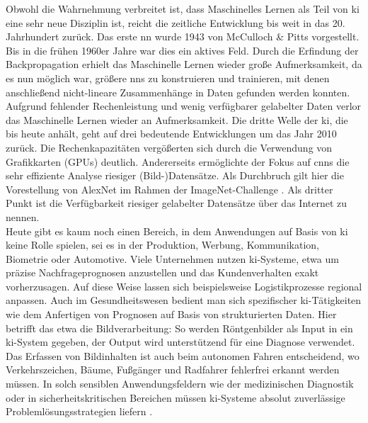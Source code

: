 \documentclass[twoside, 12pt,a4paper]{book}
\numberwithin{equation}{section}
\begin{document}
	\noindent Obwohl die Wahrnehmung verbreitet ist, dass Maschinelles Lernen als Teil von \ac{ki} eine sehr neue Disziplin ist, reicht die zeitliche Entwicklung bis weit in das 20. Jahrhundert zurück. Das erste \ac{nn} wurde 1943 von McCulloch \& Pitts vorgestellt. Bis in die frühen 1960er Jahre war dies ein aktives Feld. Durch die Erfindung der Backpropagation erhielt das Maschinelle Lernen wieder große Aufmerksamkeit, da es nun möglich war, größere \acp{nn} zu konstruieren und trainieren, mit denen anschließend nicht-lineare Zusammenhänge in Daten gefunden werden konnten.\\
	\noindent Aufgrund fehlender Rechenleistung und wenig verfügbarer gelabelter Daten verlor das Maschinelle Lernen wieder an Aufmerksamkeit. Die dritte Welle der \ac{ki}, die bis heute anhält, geht auf drei bedeutende Entwicklungen um das Jahr 2010 zurück. Die Rechenkapazitäten vergößerten sich durch die Verwendung von Grafikkarten (GPUs) deutlich. Andererseits ermöglichte der Fokus auf \acp{cnn} die sehr effiziente Analyse riesiger (Bild-)Datensätze. Als Durchbruch gilt hier die Vorestellung von AlexNet \cite{alexnet} im Rahmen der ImageNet-Challenge \cite{imagenet}. Als dritter Punkt ist die Verfügbarkeit riesiger gelabelter Datensätze über das Internet zu nennen.\\
	
	
	\noindent Heute gibt es kaum noch einen Bereich, in dem Anwendungen auf Basis von \ac{ki} keine Rolle spielen, sei es in der Produktion, Werbung, Kommunikation, Biometrie oder Automotive. Viele Unternehmen nutzen \ac{ki}-Systeme, etwa um präzise Nachfrageprognosen anzustellen und das Kundenverhalten exakt vorherzusagen. Auf diese Weise lassen sich beispielsweise Logistikprozesse regional anpassen. Auch im Gesundheitswesen bedient man sich spezifischer \ac{ki}-Tätigkeiten wie dem Anfertigen von Prognosen auf Basis von strukturierten Daten. Hier betrifft das etwa die Bildverarbeitung: So werden Röntgenbilder als Input in ein \ac{ki}-System gegeben, der Output wird unterstützend für eine Diagnose verwendet. Das Erfassen von Bildinhalten ist auch beim autonomen Fahren entscheidend, wo Verkehrszeichen, Bäume, Fußgänger und Radfahrer fehlerfrei erkannt werden müssen. In solch sensiblen Anwendungsfeldern wie der medizinischen Diagnostik oder in sicherheitskritischen Bereichen müssen \ac{ki}-Systeme absolut zuverlässige Problemlösungsstrategien liefern \cite{fh1}.\\
	
\end{document}
